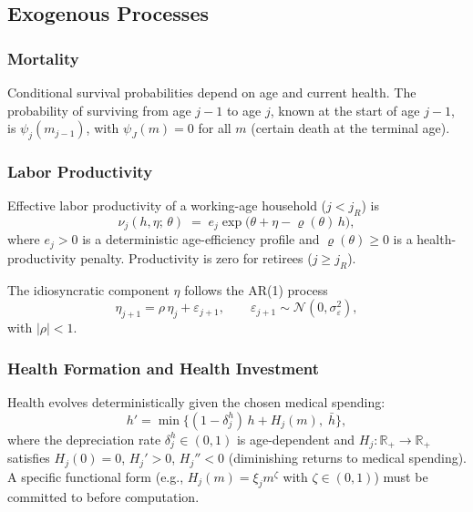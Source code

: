\documentclass[12pt,a4paper]{article}
\begin{document}
\subsection{Exogenous Processes}
\label{subsec:exogenous}

\subsubsection{Mortality}
\label{subsubsec:mortality}

Conditional survival probabilities depend on age and current health. The probability of surviving from age $j-1$ to age $j$, known at the start of age $j-1$, is $\psi_j(m_{j-1})$, with $\psi_J(m) = 0$ for all $m$ (certain death at the terminal age).

\subsubsection{Labor Productivity}
\label{subsubsec:productivity}

Effective labor productivity of a working-age household ($j < j_R$) is
\begin{equation}
\label{eq:labor_productivity}
\nu_j(h, \eta;\, \theta) \;=\; e_j \exp\bigl(\theta + \eta - \varrho(\theta)\, h\bigr),
\end{equation}
where $e_j > 0$ is a deterministic age-efficiency profile and $\varrho(\theta) \geq 0$ is a health-productivity penalty. Productivity is zero for retirees ($j \geq j_R$).

The idiosyncratic component $\eta$ follows the AR(1) process
\begin{equation}
\label{eq:ar1}
\eta_{j+1} = \rho\, \eta_j + \varepsilon_{j+1}, \qquad \varepsilon_{j+1} \sim \mathcal{N}(0, \sigma_\varepsilon^2),
\end{equation}
with $|\rho| < 1$. 

\subsubsection{Health Formation and Health Investment}
\label{subsubsec:health}

Health evolves deterministically given the chosen medical spending:
\begin{equation}
\label{eq:health_formation}
h' = \min\bigl\{(1 - \delta_j^h)\, h + H_j(m),\; \bar h\bigr\},
\end{equation}
where the depreciation rate $\delta_j^h \in (0, 1)$ is age-dependent and $H_j: \mathbb{R}_+ \to \mathbb{R}_+$ satisfies $H_j(0) = 0$, $H_j' > 0$, $H_j'' < 0$ (diminishing returns to medical spending). A specific functional form (e.g., $H_j(m) = \xi_j m^{\zeta}$ with $\zeta \in (0,1)$) must be committed to before computation.
\end{document}
